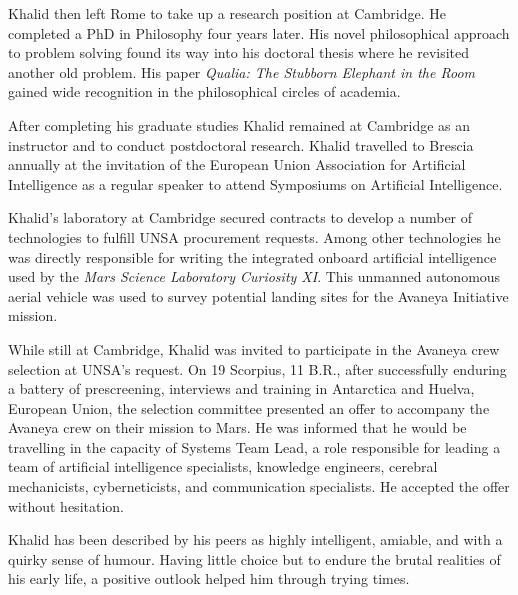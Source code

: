 Khalid then left Rome to take up a research position at Cambridge. He completed a PhD in Philosophy four years later. His novel philosophical approach to problem solving found its way into his doctoral thesis where he revisited another old problem. His paper {\it Qualia: The Stubborn Elephant in the Room} gained wide recognition in the philosophical circles of academia.

After completing his graduate studies Khalid remained at Cambridge as an instructor and to conduct postdoctoral research. Khalid travelled to Brescia annually at the invitation of the European Union Association for Artificial Intelligence as a regular speaker to attend Symposiums on Artificial Intelligence.

Khalid's laboratory at Cambridge secured contracts to develop a number of technologies to fulfill UNSA  procurement requests. Among other technologies he was directly responsible for writing the integrated onboard artificial intelligence used by the {\it Mars Science Laboratory Curiosity XI}. This unmanned autonomous aerial vehicle was used to survey potential landing sites for the Avaneya Initiative mission.

While still at Cambridge, Khalid was invited to participate in the Avaneya crew selection at UNSA's request. On 19 Scorpius, 11 B.R., after successfully enduring a battery of prescreening, interviews and training in Antarctica and Huelva, European Union, the selection committee presented an offer to accompany the Avaneya crew on their mission to Mars. He was informed that he would be travelling in the capacity of Systems Team Lead, a role responsible for leading a team of artificial intelligence specialists, knowledge engineers, cerebral mechanicists, cyberneticists, and communication specialists. He accepted the offer without hesitation.

Khalid has been described by his peers as highly intelligent, amiable, and with a quirky sense of humour. Having little choice but to endure the brutal realities of his early life, a positive outlook helped him through trying times.

